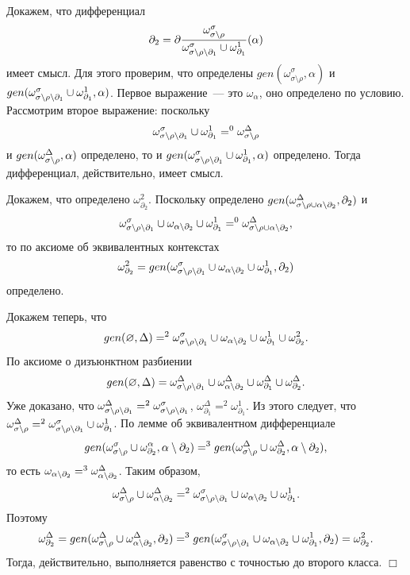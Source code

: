 Докажем, что дифференциал $$\partial_2 = \partial\dfrac{\omega^\sigma_{\sigma\setminus\rho}}{\omega^\sigma_{{\sigma\setminus\rho\setminus\partial_1}} \cup \omega^1_{\partial_1}}(\alpha)$$ 
имеет смысл. Для этого проверим, что определены $gen(\omega^\sigma_{\sigma\setminus\rho}, \alpha)$ и $gen(\omega^\sigma_{{\sigma\setminus\rho\setminus\partial_1}} \cup \omega^1_{\partial_1}, \alpha)$. Первое выражение~--- это $\omega_\alpha$, оно определено по условию. Рассмотрим второе выражение: поскольку $$\omega^\sigma_{{\sigma\setminus\rho\setminus\partial_1}} \cup \omega^1_{\partial_1} =^0 \omega^\Delta_{{\sigma\setminus\rho}}$$ 
и $gen(\omega^\Delta_{{\sigma\setminus\rho}}, \alpha)$ определено, то и $gen(\omega^\sigma_{{\sigma\setminus\rho\setminus\partial_1}} \cup \omega^1_{\partial_1}, \alpha)$ определено. Тогда дифференциал, действительно, имеет смысл.

Докажем, что определено $\omega^2_{\partial_2}$. Поскольку определено $gen(\omega^\Delta_{{\sigma\setminus\rho} \cup {\alpha\setminus{\partial_2}}}, \partial_2)$ и $$\omega^\sigma_{{\sigma\setminus\rho\setminus\partial_1}} \cup \omega_{{\alpha\setminus{\partial_2}}} \cup \omega^1_{\partial_1} =^0 \omega^\Delta_{{\sigma\setminus\rho} \cup {\alpha\setminus{\partial_2}}},$$ то по аксиоме об эквивалентных контекстах $$\omega^2_{\partial_2} = gen(\omega^\sigma_{{\sigma\setminus\rho\setminus\partial_1}} \cup \omega_{{\alpha\setminus{\partial_2}}} \cup \omega^1_{\partial_1}, \partial_2)$$ 
определено.

Докажем теперь, что $$gen(\varnothing, \Delta) =^2 \omega^\sigma_{{\sigma\setminus\rho\setminus\partial_1}} \cup \omega_{{\alpha\setminus{\partial_2}}} \cup \omega^1_{\partial_1} \cup \omega^2_{\partial_2}.$$ 
По аксиоме о дизъюнктном разбиении $$gen(\varnothing, \Delta) = \omega^\Delta_{\sigma\setminus\rho\setminus\partial_1} \cup \omega^\Delta_{\alpha\setminus{\partial_2}} \cup \omega^\Delta_{\partial_1} \cup \omega^\Delta_{\partial_2}.$$ 
Уже доказано, что $\omega^\Delta_{{\sigma\setminus\rho\setminus\partial_1}} =^2 \omega^\sigma_{{\sigma\setminus\rho\setminus\partial_1}}$, $\omega^\Delta_{\partial_1} =^2 \omega^1_{\partial_1}$. Из этого следует, что $\omega^\Delta_{{\sigma\setminus\rho}} =^2 \omega^\sigma_{{\sigma\setminus\rho\setminus\partial_1}} \cup \omega^1_{\partial_1}$. По лемме об эквивалентном дифференциале $$gen(\omega^\sigma_{{\sigma\setminus\rho}} \cup \omega^\alpha_{\partial_2}, {\alpha\setminus{\partial_2}}) =^3 gen(\omega^\Delta_{\sigma\setminus\rho} \cup \omega^\Delta_{\partial_2}, {\alpha\setminus{\partial_2}}),$$ 
то есть $\omega_{{\alpha\setminus{\partial_2}}} =^3 \omega^\Delta_{{\alpha\setminus{\partial_2}}}$. Таким образом, $$\omega^\Delta_{{\sigma\setminus\rho}} \cup \omega^\Delta_{{\alpha\setminus{\partial_2}}} =^2 \omega^\sigma_{{\sigma\setminus\rho\setminus\partial_1}} \cup \omega_{{\alpha\setminus{\partial_2}}} \cup \omega^1_{\partial_1}.$$ 
Поэтому $$\omega^\Delta_{\partial_2} = gen(\omega^\Delta_{{\sigma\setminus\rho}} \cup \omega^\Delta_{{\alpha\setminus{\partial_2}}}, \partial_2) =^3 gen(\omega^\sigma_{{\sigma\setminus\rho\setminus\partial_1}} \cup \omega_{{\alpha\setminus{\partial_2}}} \cup \omega^1_{\partial_1}, \partial_2) = \omega^2_{\partial_2}.$$ 
Тогда, действительно, выполняется равенство с точностью до второго класса. $\Box$\\

